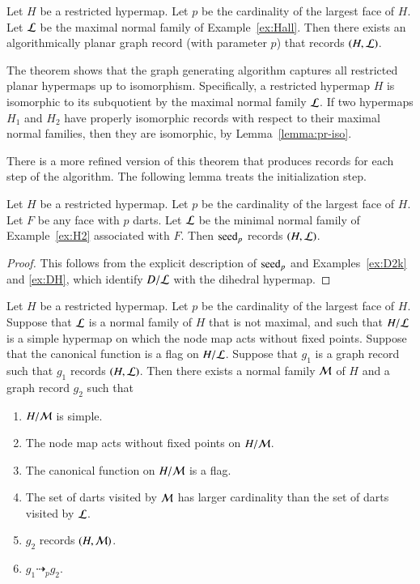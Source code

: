 \begin{theorem}\label{lemma:bn}
  Let $H$ be a restricted hypermap.  Let $p$ be the cardinality of the
  largest face of $H$. Let ${\cal L}$ be the maximal normal family of
  Example~\ref{ex:Hall}.  Then there exists an algorithmically planar
  graph record (with parameter $p$) that records $(H,{\cal L})$.
\end{theorem}

The theorem shows that the graph generating algorithm captures all
restricted planar hypermaps up to isomorphism.  Specifically, a
restricted hypermap $H$ is isomorphic to its subquotient by the maximal
normal family ${\cal L}$.  If two hypermaps $H_1$ and $H_2$ have
properly isomorphic records with respect to their maximal normal
families, then they are isomorphic, by Lemma~\ref{lemma:pr-iso}.


There is a more refined version of this theorem that produces records for each
step of the algorithm.  The following lemma treats the initialization step.

\begin{lemma}\label{lemma:algo-init}
  Let $H$ be a restricted hypermap.  Let $p$ be the cardinality of the
  largest face of $H$.  Let $F$ be any face with $p$ darts.  Let
  ${\cal L}$ be the minimal normal family of Example~\ref{ex:H2}
  associated with $F$.  Then ${\operatorname{seed}}_p$ records $(H,{\cal L})$.
\end{lemma}

\begin{proof}
  This follows from the explicit description of ${\operatorname{seed}}_p$ and
  Examples~\ref{ex:D2k} and \ref{ex:DH}, which identify $D/{\cal L}$
  with the dihedral hypermap.
\end{proof}


\begin{lemma}\label{lemma:algo-step}  
  Let $H$ be a restricted hypermap.  Let $p$ be the cardinality of the
  largest face of $H$.  Suppose that ${\cal L}$ is a normal family of
  $H$ that is not maximal, and such that $H/{\cal L}$ is a simple
  hypermap on which the node map acts without fixed points.  Suppose
  that the canonical function is a flag on $H/{\cal L}$.  Suppose that
  $g_1$ is a graph record such that $g_1$ records $(H,{\cal L})$.
  Then there exists a normal family ${\cal M}$ of $H$ and a graph
  record $g_2$ such that
\begin{enumerate}
\item $H/{\cal M}$ is simple.
\item The node map acts without fixed points on $H/{\cal M}$.
\item The canonical function on $H/{\cal M}$ is a flag.
\item The set of darts visited by ${\cal M}$ has larger cardinality than the set of
darts visited by ${\cal L}$.
\item $g_2$ records $(H,{\cal M})$.
\item $g_1 \dashrightarrow_p g_2$.
\end{enumerate}
\end{lemma}

